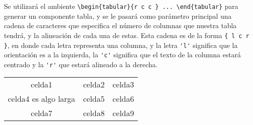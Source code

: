 \documentclass[12pt,letterpaper,oneside]{article}
\begin{document}
Se utilizará el ambiente \verb|\begin{tabular}{r c c } ... \end{tabular}| para generar un componente tabla, y se le pasará como parámetro principal una cadena de caracteres que especifica el número de columnas que nuestra tabla tendrá, y la alineación de cada una de estas. Esta cadena es de la forma \verb|{ l c r }|, en donde cada letra representa una columna, y la letra \verb|'l'| significa que la orientación es a la izquierda, la \verb|'c'| significa que el texto de la columna estará centrado y la \verb|'r'| que estará alineado a la derecha.

\begin{center} %
\begin{tabular}{ |c|c|c| } 
 \hline %
 celda1 & celda2 & celda3 \\ 
 celda4 es algo larga & celda5 & celda6 \\ 
 celda7 & celda8 & celda9 \\ 
 \hline %
\end{tabular}
\end{center}
\end{document}
